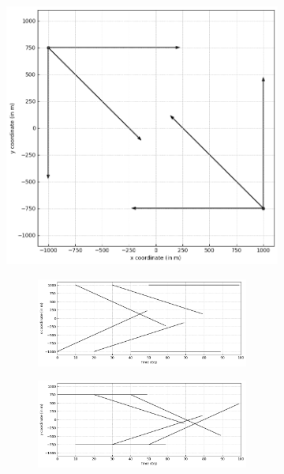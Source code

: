 \begin{figure}
    \centering
    \begin{subfigure}[]{0.48\linewidth}
        \centering
        \includegraphics[width=\linewidth]{figures/c2-tracks.png}
    \end{subfigure}
    \hfill
    \begin{subfigure}[]{0.48\linewidth}
        \centering
        \begin{subfigure}[t]{\linewidth}
            \includegraphics[width=\linewidth]{figures/c2-coord-x.png}
        \end{subfigure}
        \vfill\par
        \begin{subfigure}[b]{\linewidth}
            \includegraphics[width=\linewidth]{figures/c2-coord-y.png}

\end{subfigure}
\end{subfigure}
\end{figure}
